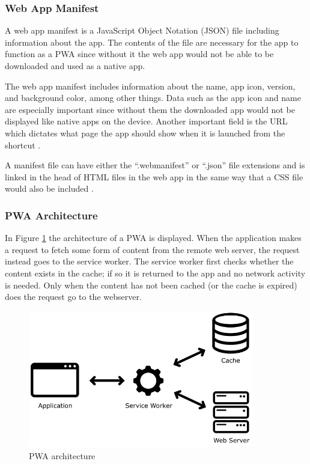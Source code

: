 \documentclass[a4paper,12pt]{article}
\begin{document}
\subsubsection{Web App Manifest}
\label{Theory_PWA_webManifest}
A web app manifest is a JavaScript Object Notation (JSON) file including information about the app. The contents of the file are necessary for the app to function as a PWA since without it the web app would not be able to be downloaded and used as a native app.

The web app manifest includes information about the name, app icon, version, and background color, among other things. Data such as the app icon and name are especially important since without them the downloaded app would not be displayed like native apps on the device. Another important field is the URL which dictates what page the app should show when it is launched from the shortcut \cite{mozilla_webmanifest}.

A manifest file can have either the “.webmanifest” or “.json” file extensions and is linked in the head of HTML files in the web app in the same way that a CSS file would also be included \cite{mozilla_webmanifest}.

\subsubsection{PWA Architecture}
\label{Theory_PWA_architecture}
In Figure \ref{fig:pwaapp} the architecture of a PWA is displayed. When the application makes a request to fetch some form of content from the remote web server, the request instead goes to the service worker. The service worker first checks whether the content exists in the cache; if so it is returned to the app and no network activity is needed. Only when the content has not been cached (or the cache is expired) does the request go to the webserver.

\begin{figure}[h]%
	\centering
	\includegraphics[height=6cm]{img/Other/struct_pwa.png}
	\caption{PWA architecture}%
	\label{fig:pwaapp}%
\end{figure}
\end{document}
